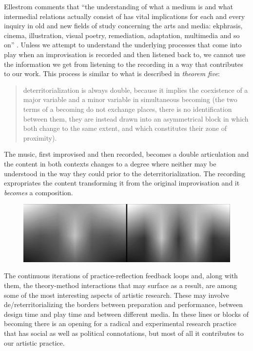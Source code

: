 \documentclass[11pt]{article}
\begin{document}
Ellestrom comments that ``the understanding of what
a medium is and what intermedial relations actually consist of has
vital implications for each and every inquiry in old and new fields of
study concerning the arts and media: ekphrasis, cinema, illustration,
visual poetry, remediation, adaptation, multimedia and so on''
\citep[p. 11]{Ellestrom2010}. Unless we attempt to understand the
underlying processes that come into play when an improvisation is
recorded and then listened back to, we cannot use the information we
get from listening to the recording in a way that contributes to
our work. This process is similar to what is described
in \emph{theorem five}:
\begin{quote}
  deterritorialization is always double, because it implies the
  coexistence of a major variable and a minor variable in simultaneous
  becoming (the two terms of a becoming do not exchange places, there
  is no identification between them, they are instead drawn into an
  asymmetrical block in which both change to the same extent, and
  which constitutes their zone of proximity). \citep[p. 338]{deleuze80}
\end{quote}
The music, first improvised and then recorded, becomes a double
articulation and the content in both contexts changes to a
degree where neither may be understood in the way they could prior to
the deterritorialization. The recording
expropriates the content transforming it from the original
improvisation and it \emph{becomes} a composition.

\begin{figure}\label{fig:impro-1}
  \centering
  \includegraphics[width=\linewidth]{img/final/Mongrel_mist_2pr_row_ELISK_monoC}
\end{figure}

The continuous iterations of
practice-reflection feedback loops and, along with them, the
theory-method interactions that may surface as a result, are among
some of the most interesting aspects of artistic research. These
may involve de/reterritorializing the borders between preparation and
performance, between design time and play time and between different
media. In these lines or blocks of becoming there is an opening for a radical
and experimental research practice that has social as well as
political connotations, but most of all it contributes to our artistic practice.
\end{document}
